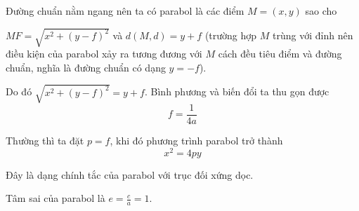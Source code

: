 Đường chuẩn nằm ngang nên ta có parabol là các điểm $M = (x, y)$ sao cho

$MF = \sqrt{x^2 + (y-f)^2}$ và $d(M, d) = y+f$ 
(trường hợp $M$ trùng với đỉnh nên điều kiện của parabol xảy ra tương đương với $M$ cách đều tiêu điểm và đường chuẩn, nghĩa là đường chuẩn có dạng $y=-f$).

Do đó $\sqrt{x^2 + (y-f)^2} = y + f$. Bình phương và biến đổi ta thu gọn được
$$f = \frac{1}{4a}$$

Thường thì ta đặt $p = f$, khi đó phương trình parabol trở thành 
$$x^2 = 4py$$

Đây là dạng chính tắc của parabol với trục đối xứng dọc.

Tâm sai của parabol là $e = \frac{c}{a} = 1$.

\newpage

